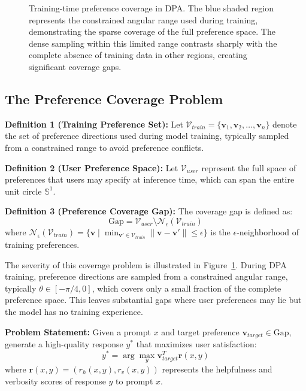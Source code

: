 \documentclass{article} %
\begin{document}
\begin{figure}[t]
\begin{minipage}[t]{0.48\textwidth}
\caption{Training-time preference coverage in DPA. The blue shaded region represents the constrained angular range used during training, demonstrating the sparse coverage of the full preference space. The dense sampling within this limited range contrasts sharply with the complete absence of training data in other regions, creating significant coverage gaps.}
\label{fig:dpa_training_range_new}
\end{minipage}
\end{figure}

\subsection{The Preference Coverage Problem}

\textbf{Definition 1 (Training Preference Set):} Let $\mathcal{V}_{train} = \{\mathbf{v}_1, \mathbf{v}_2, \ldots, \mathbf{v}_n\}$ denote the set of preference directions used during model training, typically sampled from a constrained range to avoid preference conflicts.

\textbf{Definition 2 (User Preference Space):} Let $\mathcal{V}_{user}$ represent the full space of preferences that users may specify at inference time, which can span the entire unit circle $\mathbb{S}^1$.

\textbf{Definition 3 (Preference Coverage Gap):} The coverage gap is defined as:
\begin{equation}
\text{Gap} = \mathcal{V}_{user} \setminus \mathcal{N}_\epsilon(\mathcal{V}_{train})
\end{equation}
where $\mathcal{N}_\epsilon(\mathcal{V}_{train}) = \{\mathbf{v} \mid \min_{\mathbf{v}' \in \mathcal{V}_{train}} \|\mathbf{v} - \mathbf{v}'\| \leq \epsilon\}$ is the $\epsilon$-neighborhood of training preferences.

The severity of this coverage problem is illustrated in Figure~\ref{fig:dpa_training_range_new}. During DPA training, preference directions are sampled from a constrained angular range, typically $\theta \in [-\pi/4, 0]$, which covers only a small fraction of the complete preference space. This leaves substantial gaps where user preferences may lie but the model has no training experience.

\textbf{Problem Statement:} Given a prompt $x$ and target preference $\mathbf{v}_{target} \in \text{Gap}$, generate a high-quality response $y^*$ that maximizes user satisfaction:
\begin{equation}
y^* = \arg\max_y \mathbf{v}_{target}^T \mathbf{r}(x, y)
\end{equation}
where $\mathbf{r}(x, y) = (r_h(x,y), r_v(x,y))$ represents the helpfulness and verbosity scores of response $y$ to prompt $x$.
\end{document}
